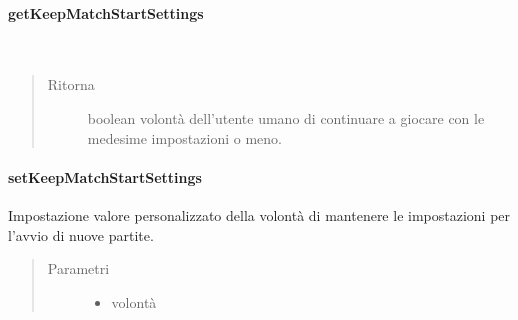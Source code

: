 \documentclass[letterpaper,10pt,italian,openany,oneside]{sphinxmanual}
\begin{document}
\paragraph{getKeepMatchStartSettings}
\label{\detokenize{source/it/unicam/cs/pa/mastermind/gamecore/StartupSettings:getkeepmatchstartsettings}}

\begin{fulllineitems}
\label{\detokenize{source/it/unicam/cs/pa/mastermind/gamecore/StartupSettings:it.unicam.cs.pa.mastermind.gamecore.StartupSettings.getKeepMatchStartSettings()}}~\begin{quote}\begin{description}
\item[{Ritorna}] \leavevmode
boolean volontà dell’utente umano di continuare a giocare con le medesime impostazioni o meno.

\end{description}\end{quote}

\end{fulllineitems}



\paragraph{setKeepMatchStartSettings}
\label{\detokenize{source/it/unicam/cs/pa/mastermind/gamecore/StartupSettings:setkeepmatchstartsettings}}

\begin{fulllineitems}
\label{\detokenize{source/it/unicam/cs/pa/mastermind/gamecore/StartupSettings:it.unicam.cs.pa.mastermind.gamecore.StartupSettings.setKeepMatchStartSettings(boolean)}}
Impostazione valore personalizzato della volontà di mantenere le impostazioni per l’avvio di nuove partite.
\begin{quote}\begin{description}
\item[{Parametri}] \leavevmode\begin{itemize}
\item {} 
 \textendash{} volontà

\end{itemize}

\end{description}\end{quote}

\end{fulllineitems}
\end{document}
